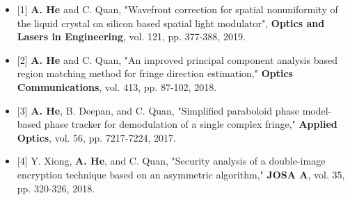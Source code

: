 \documentclass[a4paper,12pt]{article} %
\begin{document}
\begin{itemize} [leftmargin=0cm]
	\setlength\itemsep{-0.15em}
	\item[] {[1] \textbf{A. He} and C. Quan, "Wavefront correction for spatial nonuniformity of the liquid crystal on silicon based spatial light modulator",\textbf{ Optics and Lasers in Engineering}, vol. 121, pp. 377-388, 2019. }
	\item[] {[2] \textbf{A. He} and C. Quan, "An improved principal component analysis based region matching method for fringe direction estimation," \textbf{Optics Communications}, vol. 413, pp. 87-102, 2018.}
	\item[] {[3] \textbf{A. He}, B. Deepan, and C. Quan, "Simplified paraboloid phase model-based phase tracker for demodulation of a single complex fringe," \textbf{Applied Optics}, vol. 56, pp. 7217-7224, 2017.}
	\item[] {[4] Y. Xiong, \textbf{A. He}, and C. Quan, "Security analysis of a double-image encryption technique based on an asymmetric algorithm," \textbf{JOSA A}, vol. 35, pp. 320-326, 2018.}
\end{itemize}
\end{document}

